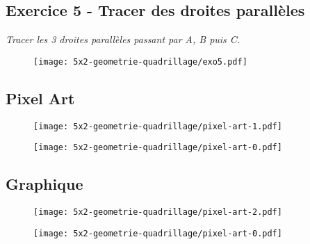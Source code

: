 \subsection*{Exercice 5 - Tracer des droites parallèles}

\textit{Tracer les 3 droites parallèles passant par A, B puis C.}

\begin{figure}[H]
  \centering
  \texttt{[image: 5x2-geometrie-quadrillage/exo5.pdf]}
\end{figure}

\subsection*{Pixel Art}


\begin{multicols}{2}
\begin{figure}[H]
  \centering
  \texttt{[image: 5x2-geometrie-quadrillage/pixel-art-1.pdf]}
\end{figure}

\begin{figure}[H]
  \centering
  \texttt{[image: 5x2-geometrie-quadrillage/pixel-art-0.pdf]}
\end{figure}
\end{multicols}

\subsection*{Graphique}


\begin{multicols}{2}
\begin{figure}[H]
  \centering
  \texttt{[image: 5x2-geometrie-quadrillage/pixel-art-2.pdf]}
\end{figure}

\begin{figure}[H]
  \centering
  \texttt{[image: 5x2-geometrie-quadrillage/pixel-art-0.pdf]}
\end{figure}
\end{multicols}

